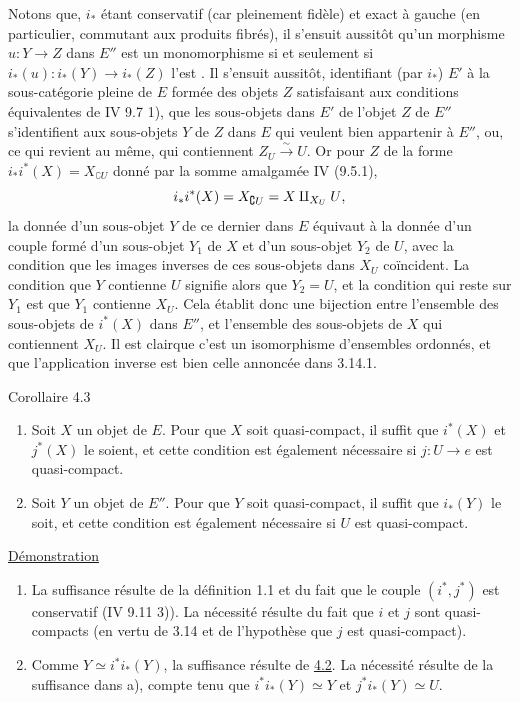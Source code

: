 \documentclass[10pt]{../fichiers-configuration-latex/smfart}
\begin{document}
Notons que, $i_{\ast}$ étant conservatif (car pleinement fidèle) et
exact à gauche (en particulier, commutant aux produits fibrés), il
s'ensuit aussitôt qu'un morphisme $u : Y \to Z$ dans $E''$ est un
monomorphisme si et seulement si $i_{\ast}(u) : i_{\ast}(Y) \to
i_{\ast}(Z)$ l'est . Il s'ensuit aussitôt, identifiant (par
$i_{\ast}$) $E'$ à la sous-catégorie pleine de $E$ formée des objets
$Z$ satisfaisant aux conditions équivalentes de IV 9.7 1), que les
sous-objets dans $E'$ de l'objet $Z$ de $E''$ s'identifient aux
sous-objets $Y$ de $Z$ dans $E$ qui veulent bien appartenir à $E''$,
ou, ce qui revient au même, qui contiennent $Z_U \xrightarrow{\sim}
U$. Or pour $Z$ de la forme $i_{\ast} i^{\ast} (X) = X_{\complement
U}$ donné par la somme amalgamée IV (9.5.1),
$$
i_{\ast} i^{\ast} (X) = X_{\complement U} = X \amalg_{X_U} U {},
$$
la donnée d'un sous-objet $Y$ de ce dernier dans $E$ équivaut à la
donnée d'un couple formé d'un sous-objet $Y_1$ de $X$ et d'un sous-objet
$Y_2$ de $U$, avec la condition que les images inverses de ces
sous-objets dans $X_U$ coïncident. La condition que $Y$ contienne $U$
signifie alors que $Y_2 = U$, et la condition qui reste sur $Y_1$ est
que $Y_1$ contienne $X_U$. Cela établit donc une bijection entre
l'ensemble des sous-objets de $i^{\ast}(X)$ dans $E''$, et l'ensemble
des sous-objets de $X$ qui contiennent $X_U$. Il est
clair\pageoriginale que c'est un isomorphisme d'ensembles ordonnés,
et que l'application inverse est bien celle annoncée
dans 3.14.1.

\begin{enonce*}{Corollaire 4.3}
\begin{enumerate}
\renewcommand{\theenumi}{\alph{enumi}}
\renewcommand{\labelenumi}{\theenumi)}
\item Soit $X$ un objet de $E$. Pour que $X$ soit quasi-compact, il
  suffit que $i^{\ast}(X)$ et $j^{\ast}(X)$ le soient, et cette
  condition est également nécessaire si $j : U \to e$ est
  quasi-compact.

\item Soit $Y$ un objet de $E''$. Pour que $Y$ soit quasi-compact, il
  suffit que $i_{\ast} (Y)$ le soit, et cette condition est également
  nécessaire si $U$ est quasi-compact.
\end{enumerate}
\end{enonce*}

\noindent
\underline{Démonstration}
\begin{enumerate}
\renewcommand{\theenumi}{\alph{enumi}}
\renewcommand{\labelenumi}{\theenumi)}
\item La suffisance résulte de la définition 1.1 et du fait que le
  couple $(i^{\ast}, j^{\ast})$ est conservatif (IV 9.11 3)). La
  nécessité résulte du fait que $i$ et $j$ sont quasi-compacts (en
  vertu de 3.14 et de l'hypothèse que $j$ est quasi-compact).

\item Comme $Y \simeq i^{\ast} i_{\ast}(Y)$, la suffisance résulte de
  \hyperref[VI.prop4.2]{4.2}. La nécessité résulte de la suffisance dans a), compte tenu que
  $i^{\ast}i_{\ast}(Y) \simeq Y$ et $j^{\ast}i_{\ast}(Y)\simeq U$.
\end{enumerate}
\end{document}

